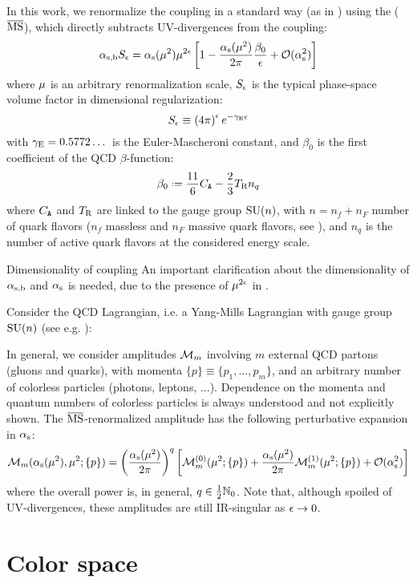 In this work, we renormalize the coupling in a standard way (as in \cite{Catani-1998}) using the  ($ \overline{\text{MS}} $), which directly subtracts UV-divergences from the coupling:
\begin{equation}
  \alpha_\text{s,b} S_\epsilon = \alpha_\text{s}(\mu^2) \mu^{2\epsilon} \left[ 1 - \frac{\alpha_\text{s}(\mu^2)}{2\pi} \frac{\beta_0}{\epsilon} + \mathcal{O}(\alpha_\text{s}^2) \right]
  \label{eq:msb-def}
\end{equation}
where $ \mu $ is an arbitrary renormalization scale, $ S_\epsilon $ is the typical phase-space volume factor in dimensional regularization:
\begin{equation}
  S_\epsilon \equiv \left( 4\pi \right)^\epsilon e^{-\gamma_\text{E} \epsilon}
\end{equation}
with $ \gamma_\text{E} = 0.5772\dots $ is the Euler-Mascheroni constant, and $ \beta_0 $ is the first coefficient of the QCD $ \beta $-function:
\begin{equation}
  \beta_0 \defeq \frac{11}{6} \caa - \frac{2}{3} \ttr n_q
\end{equation}
where $ C_\mathtt{A} $ and $ T_\text{R} $ are linked to the gauge group $ \mathrm{SU}(n) $, with $ n = n_f + n_F $ number of quark flavors ($ n_f $ massless and $ n_F $ massive quark flavors, see ), and $ n_q $ is the number of active quark flavors at the considered energy scale.

\begin{observation}{Dimensionality of coupling}{}
  An important clarification about the dimensionality of $ \alpha_\text{s,b} $ and $ \alpha_\text{s} $ is needed, due to the presence of $ \mu^{2\epsilon} $ in .

  Consider the QCD Lagrangian, i.e. a Yang-Mills Lagrangian with gauge group $ \mathrm{SU}(n) $ (see e.g. ):
\end{observation}

In general, we consider amplitudes $ \mathcal{M}_m $ involving $ m $ external QCD partons (gluons and quarks), with momenta $ \{p\} \equiv \{p_1, \dots, p_m\} $, and an arbitrary number of colorless particles (photons, leptons, ...). Dependence on the momenta and quantum numbers of colorless particles is always understood and not explicitly shown. The $ \overline{\text{MS}} $-renormalized amplitude has the following perturbative expansion in $ \alpha_\text{s} $:
\begin{equation}
  \mathcal{M}_m(\alpha_\text{s}(\mu^2), \mu^2 ; \{p\}) = \left( \frac{\alpha_\text{s}(\mu^2)}{2\pi} \right)^q \left[ \mathcal{M}_m^{(0)}(\mu^2 ; \{p\}) + \frac{\alpha_\text{s}(\mu^2)}{2\pi} \mathcal{M}_m^{(1)}(\mu^2 ; \{p\}) + \mathcal{O}(\alpha_\text{s}^2) \right]
\end{equation}
where the overall power is, in general, $ q \in \frac{1}{2} \mathbb{N}_0 $. Note that, although spoiled of UV-divergences, these amplitudes are still IR-singular as $ \epsilon \rightarrow 0 $.

\section{Color space}
\label{sec:color-space}










